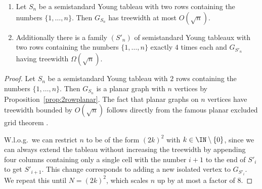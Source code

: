 \begin{proposition}
    \label{prop:semistdtreewidth}
    \begin{enumerate}
        \item
            Let $S_n$ be a semistandard Young tableau with two rows containing the numbers $\{1, \ldots, n\}$.
            Then $G_{S_n}$ has treewidth at most $O(\sqrt{n})$.
        \item
            Additionally there is a family $(S'_n)$ of semistandard Young tableaux with two rows containing the numbers $\{1, \ldots, n\}$ exactly $4$ times each and $G_{S'_n}$ having treewidth $\Omega(\sqrt{n})$.
    \end{enumerate}
\end{proposition}
\begin{proof}
    Let $S_n$ be a semistandard Young tableau with $2$ rows containing the numbers $\{1, \ldots, n\}$.
    Then $G_{S_n}$ is a planar graph with $n$ vertices by Proposition~\ref{prop:2rowplanar}.
    The fact that planar graphs on $n$ vertices have treewidth bounded by $O(\sqrt{n})$ follows directly from the famous planar excluded grid theorem \cite{DBLP:journals/jct/RobertsonST94}.

    W.l.o.g.\ we can restrict $n$ to be of the form $(2k)^2$ with $k \in \IN \setminus \{0\}$, since we can always extend the tableau without increasing the treewidth by appending four columns containing only a single cell with the number $i+1$ to the end of $S'_i$ to get $S'_{i+1}$.
    This change corresponds to adding a new isolated vertex to $G_{S'_i}$.
    We repeat this until $N=(2k)^2$, which scales $n$ up by at most a factor of 8.


\end{proof}

